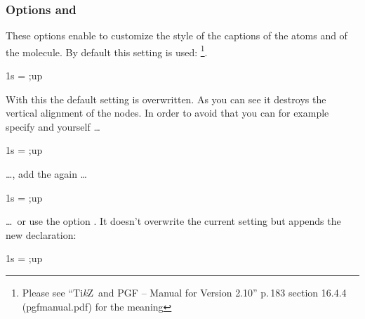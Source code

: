 \documentclass[load-preamble+]{cnltx-doc}
\newcommand*\TikZ{Ti\textit{k}Z}
\begin{document}
\subsubsection{Options  and }\label{option:names_style}
These options enable to customize the style of the captions of the atoms and
of the molecule. By default this setting is used:
\footnote{Please see ``\TikZ\ and PGF -- Manual
  for Version 2.10'' p.\,183 section 16.4.4 (pgfmanual.pdf) for the meaning}.
\begin{example}
  \begin{MOdiagram}[names,names-style={draw=blue}]
     { 1s = {;up} }
  \end{MOdiagram}
\end{example}

With this the default setting is overwritten. As you can see it destroys the
vertical alignment of the nodes. In order to avoid that you can for example
specify  and  yourself \ldots
\begin{example}
  \begin{MOdiagram}[names,names-style={text height=1.5ex, text depth=.25ex, draw=blue}]
     { 1s = {;up} }
  \end{MOdiagram}
\end{example}

\ldots, add the  again \ldots
\begin{example}
  \begin{MOdiagram}[names,names-style={anchor=base, draw=blue}]
     { 1s = {;up} }
  \end{MOdiagram}
\end{example}

\ldots\ or use the option . It doesn't overwrite the
current setting but appends the new declaration:
\begin{example}
  \begin{MOdiagram}[names,names-style-add={draw=blue}]
     { 1s = {;up} }
  \end{MOdiagram}
\end{example}
\end{document}
